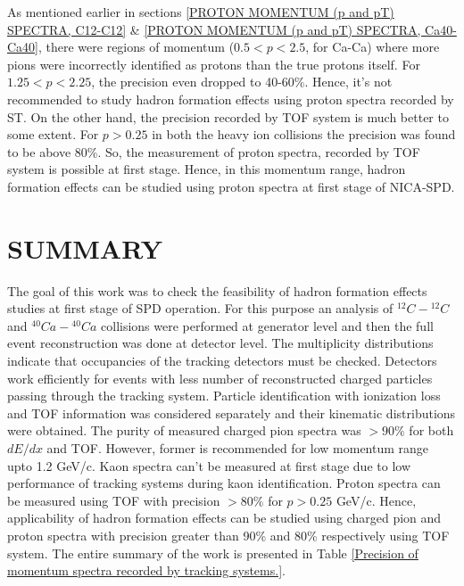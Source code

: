 \documentclass[12pt, twocolumn]{article}
\begin{document}

As mentioned earlier in sections \ref{PROTON MOMENTUM (p and pT) SPECTRA, C12-C12} \& \ref{PROTON MOMENTUM (p and pT) SPECTRA, Ca40-Ca40}, there were regions of momentum ($0.5 < p < 2.5$, for Ca-Ca) where more pions were incorrectly identified as protons than the true protons itself. For $1.25 < p < 2.25$, the precision even dropped to 40-60\%. Hence, it's not recommended to study hadron formation effects using proton spectra recorded by ST. On the other hand, the precision recorded by TOF system is much better to some extent. For $p > 0.25$ in both the heavy ion collisions the precision was found to be above 80\%. So, the measurement of proton spectra, recorded by TOF system is possible at first stage. Hence, in this momentum range, hadron formation effects can be studied using proton spectra at first stage of NICA-SPD.


\section{SUMMARY}
The goal of this work was to check the feasibility of hadron
formation effects studies at first stage of SPD operation. For this purpose
an analysis of $^{12}C-{^{12}C}$ and $^{40}Ca-{^{40}Ca}$
collisions were performed at generator level and then the full event reconstruction was done at detector level. The multiplicity distributions
indicate that occupancies of the tracking detectors must be checked.
Detectors work efficiently for events with less number of reconstructed charged particles passing through the tracking system. Particle identification with ionization loss and TOF information was considered separately and their kinematic distributions were obtained. The purity of measured charged pion spectra was $>90\%$ for both $dE/dx$ and TOF. However, former is recommended for low momentum range upto 1.2 GeV/c. Kaon spectra can't be measured at first stage due to low performance of tracking systems during kaon identification. Proton spectra can be measured using TOF with precision $>80\%$ for $p>0.25$ GeV/c. Hence, applicability of hadron formation effects can be studied using charged pion and proton spectra with precision greater than 90\% and 80\% respectively using TOF system. The entire summary of the work is presented in Table \ref{Precision of momentum spectra recorded by tracking systems.}.
  



\end{document}
